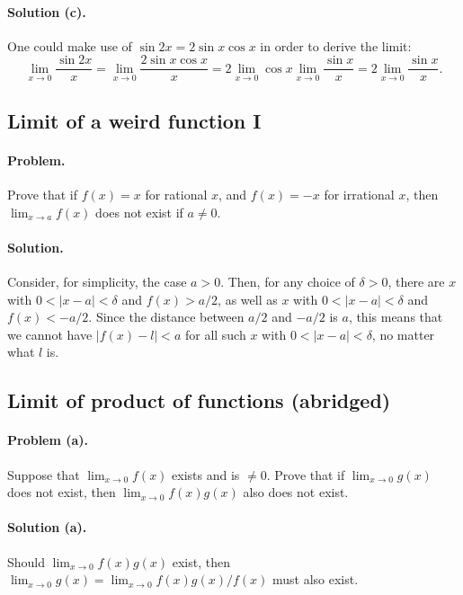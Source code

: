 \documentclass{article}
\begin{document}
\paragraph{Solution (c).} One could make use of $\sin{2x} = 2\sin{x}\cos{x}$ in
order to derive the limit: \begin{equation*}
  \lim_{x \rightarrow 0}\frac{\sin{2x}}{x} = \lim_{x \rightarrow 0}\frac{2
    \sin{x}\cos{x}}{x} = 2\lim_{x \rightarrow 0}\cos{x}\lim_{x \rightarrow 0}
    \frac{\sin{x}}{x} = 2\lim_{x \rightarrow 0}\frac{\sin{x}}{x}.
\end{equation*}

\setcounter{subsection}{19}
\subsection{Limit of a weird function I}

\paragraph{Problem.} Prove that if $f(x) = x$ for rational $x$, and $f(x) = -x$
for irrational $x$, then $\lim_{x \rightarrow a}f(x)$ does not exist if $a \neq
0$.

\paragraph{Solution.} Consider, for simplicity, the case $a > 0$. Then, for any
choice of $\delta > 0$, there are $x$ with $0 < |x - a| < \delta$ and $f(x) >
a/2$, as well as $x$ with $0 < |x - a| < \delta$ and $f(x) < -a/2$. Since the
distance between $a/2$ and $-a/2$ is $a$, this means that we cannot have $|f(x)
- l| < a$ for all such $x$ with $0 < |x - a| < \delta$, no matter what $l$ is.

\setcounter{subsection}{22}
\subsection{Limit of product of functions (abridged)}

\paragraph{Problem (a).} Suppose that $\lim_{x \rightarrow 0}f(x)$ exists and
is $\neq 0$. Prove that if $\lim_{x \rightarrow 0}g(x)$ does not exist, then
$\lim_{x \rightarrow 0}f(x)g(x)$ also does not exist.

\paragraph{Solution (a).} Should $\lim_{x \rightarrow 0}f(x)g(x)$ exist, then
$\lim_{x \rightarrow 0}g(x) = \lim_{x \rightarrow 0}f(x)g(x)/f(x)$ must also
exist.
\end{document}
